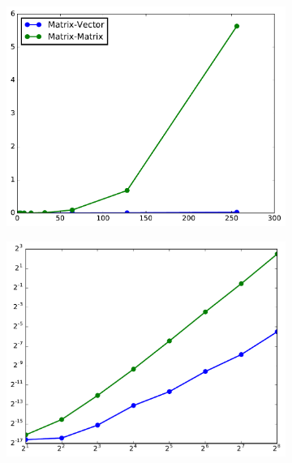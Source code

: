 \begin{figure}[H] %
\captionsetup[subfigure]{justification=centering}
\centering
\begin{subfigure}{.5\textwidth}
    \centering
    \includegraphics[width=\linewidth]{loglogDemoBad.pdf}
\end{subfigure}%
\begin{subfigure}{.5\textwidth}
    \centering
    \includegraphics[width=\linewidth]{loglogDemoGood.pdf}
\end{subfigure}
\caption{ }
\label{fig:loglogdemo}
\end{figure}

